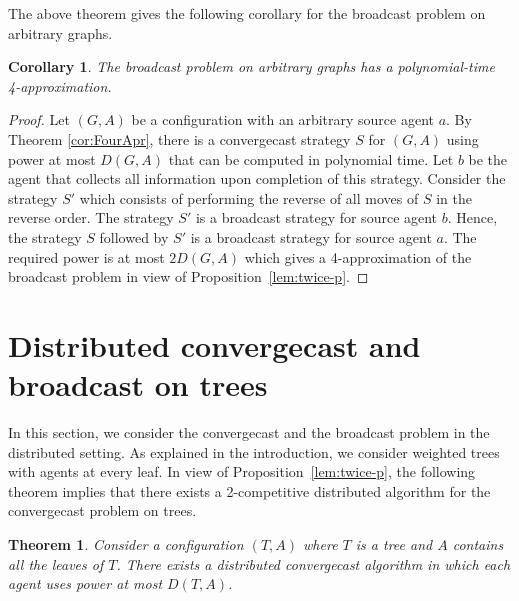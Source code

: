\documentclass{article}
\newtheorem{theorem}{Theorem}
\newtheorem{corollary}{Corollary}
\newcommand\ccast{convergecast\xspace}
\newcommand\Dccast{Distributed convergecast\xspace}
\begin{document}
\medskip

The above theorem gives the following corollary for the broadcast problem on arbitrary graphs.

\begin{corollary}
The broadcast problem on arbitrary graphs has a polynomial-time 4-approximation.
\end{corollary}

\begin{proof}
Let $(G,A)$ be a configuration with an arbitrary source agent $a$. By Theorem \ref{cor:FourApr}, there is a convergecast strategy $S$ for $(G,A)$ using power at most $D(G,A)$ that can be computed in polynomial time. Let $b$ be the agent that collects all information upon completion of this strategy. Consider the strategy $S'$ which consists of performing the reverse of all moves of $S$ in the reverse order. The strategy $S'$ is a broadcast strategy for source agent $b$. Hence, the strategy $S$ followed by $S'$ is a broadcast strategy for source agent $a$. The required power is at most $2D(G,A)$ which gives a 4-approximation of the broadcast problem in view of Proposition~\ref{lem:twice-p}.
\end{proof}

\section{{\Dccast} and broadcast on trees}\label{s:online}

In this section, we consider the convergecast and the broadcast problem in the distributed setting. 
As explained in the introduction, we consider weighted trees with agents at every leaf. In view of Proposition~\ref{lem:twice-p}, the following theorem implies that there exists a 2-competitive distributed algorithm for the {\ccast} problem on trees.

\begin{theorem}\label{thm:FourComp}
Consider a configuration $(T,A)$ where $T$ is a tree and $A$ contains all the leaves of $T$. There exists a distributed {\ccast} algorithm in which each agent uses power at most $D(T,A)$.
\end{theorem}
\end{document}
